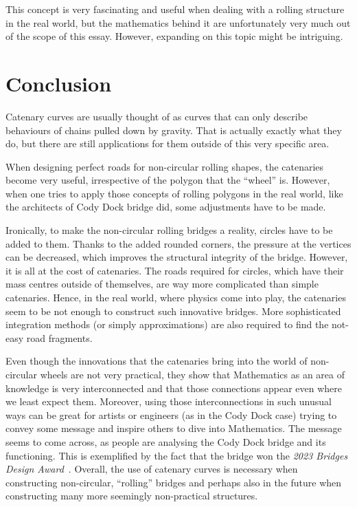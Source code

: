 \documentclass[12pt]{article}
\begin{document}
        This concept is very fascinating and useful when dealing with a rolling structure in the real world, but the mathematics behind it are unfortunately very much out of the scope of this essay. However, expanding on this topic might be intriguing.

    \section{Conclusion}

        Catenary curves are usually thought of as curves that can only describe behaviours of chains pulled down by gravity. That is actually exactly what they do, but there are still applications for them outside of this very specific area.

        When designing perfect roads for non-circular rolling shapes, the catenaries become very useful, irrespective of the polygon that the ``wheel'' is. However, when one tries to apply those concepts of rolling polygons in the real world, like the architects of Cody Dock bridge did, some adjustments have to be made.

        Ironically, to make the non-circular rolling bridges a reality, circles have to be added to them. Thanks to the added rounded corners, the pressure at the vertices can be decreased, which improves the structural integrity of the bridge. However, it is all at the cost of catenaries. The roads required for circles, which have their mass centres outside of themselves, are way more complicated than simple catenaries. Hence, in the real world, where physics come into play, the catenaries seem to be not enough to construct such innovative bridges. More sophisticated integration methods (or simply approximations) are also required to find the not-easy road fragments.

        Even though the innovations that the catenaries bring into the world of non-circular wheels are not very practical, they show that Mathematics as an area of knowledge is very interconnected and that those connections appear even where we least expect them. Moreover, using those interconnections in such unusual ways can be great for artists or engineers (as in the Cody Dock case) trying to convey some message and inspire others to dive into Mathematics. The message seems to come across, as people are analysing the Cody Dock bridge and its functioning. This is exemplified by the fact that the bridge won the \textit{2023 Bridges Design Award}~\cite{bridges_awards}. Overall, the use of catenary curves is necessary when constructing non-circular, ``rolling'' bridges and perhaps also in the future when constructing many more seemingly non-practical structures.
\end{document}
